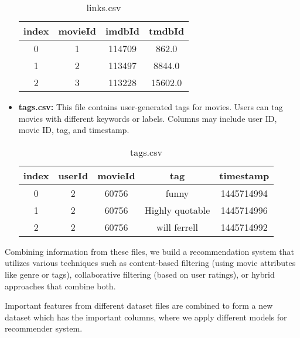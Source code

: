 \documentclass[a4paper]{article}
\theoremstyle{plain}
\theoremstyle{definition}
\begin{document}
\begin{itemize}
\begin{table}[htbp]
\centering
\caption{links.csv}
\begin{tabular}{|c|c|c|c|}
\hline
index & movieId & imdbId & tmdbId \\
\hline
0 & 1 & 114709 & 862.0 \\
1 & 2 & 113497 & 8844.0 \\
2 & 3 & 113228 & 15602.0 \\
\hline
\end{tabular}
\label{tab:links.csv}
\end{table}


    \item \textbf{\Large tags.csv:} This file contains user-generated tags for movies. Users can tag movies with different keywords or labels. Columns may include user ID, movie ID, tag, and timestamp.

\begin{table}[htbp]
\centering
\caption{tags.csv}
\begin{tabular}{|c|c|c|c|c|}
\hline
index & userId & movieId & tag & timestamp \\
\hline
0 & 2 & 60756 & funny & 1445714994 \\
1 & 2 & 60756 & Highly quotable & 1445714996 \\
2 & 2 & 60756 & will ferrell & 1445714992 \\
\hline
\end{tabular}
\label{tab:tags.csv}
\end{table}
\end{itemize}


Combining information from these files, we build a recommendation system that utilizes various techniques such as content-based filtering (using movie attributes like genre or tags), collaborative filtering (based on user ratings), or hybrid approaches that combine both.

Important features from different dataset files are combined 
to form a new dataset which has the important columns, where we apply different models for recommender system.

\end{document}
